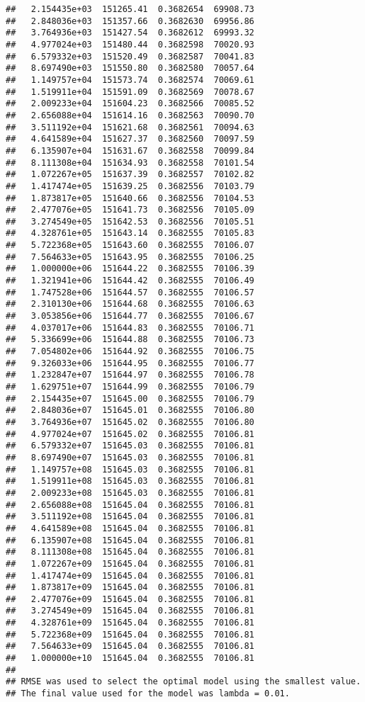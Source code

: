 \documentclass[]{article}
\begin{document}
\begin{verbatim}
##   2.154435e+03  151265.41  0.3682654  69908.73
##   2.848036e+03  151357.66  0.3682630  69956.86
##   3.764936e+03  151427.54  0.3682612  69993.32
##   4.977024e+03  151480.44  0.3682598  70020.93
##   6.579332e+03  151520.49  0.3682587  70041.83
##   8.697490e+03  151550.80  0.3682580  70057.64
##   1.149757e+04  151573.74  0.3682574  70069.61
##   1.519911e+04  151591.09  0.3682569  70078.67
##   2.009233e+04  151604.23  0.3682566  70085.52
##   2.656088e+04  151614.16  0.3682563  70090.70
##   3.511192e+04  151621.68  0.3682561  70094.63
##   4.641589e+04  151627.37  0.3682560  70097.59
##   6.135907e+04  151631.67  0.3682558  70099.84
##   8.111308e+04  151634.93  0.3682558  70101.54
##   1.072267e+05  151637.39  0.3682557  70102.82
##   1.417474e+05  151639.25  0.3682556  70103.79
##   1.873817e+05  151640.66  0.3682556  70104.53
##   2.477076e+05  151641.73  0.3682556  70105.09
##   3.274549e+05  151642.53  0.3682556  70105.51
##   4.328761e+05  151643.14  0.3682555  70105.83
##   5.722368e+05  151643.60  0.3682555  70106.07
##   7.564633e+05  151643.95  0.3682555  70106.25
##   1.000000e+06  151644.22  0.3682555  70106.39
##   1.321941e+06  151644.42  0.3682555  70106.49
##   1.747528e+06  151644.57  0.3682555  70106.57
##   2.310130e+06  151644.68  0.3682555  70106.63
##   3.053856e+06  151644.77  0.3682555  70106.67
##   4.037017e+06  151644.83  0.3682555  70106.71
##   5.336699e+06  151644.88  0.3682555  70106.73
##   7.054802e+06  151644.92  0.3682555  70106.75
##   9.326033e+06  151644.95  0.3682555  70106.77
##   1.232847e+07  151644.97  0.3682555  70106.78
##   1.629751e+07  151644.99  0.3682555  70106.79
##   2.154435e+07  151645.00  0.3682555  70106.79
##   2.848036e+07  151645.01  0.3682555  70106.80
##   3.764936e+07  151645.02  0.3682555  70106.80
##   4.977024e+07  151645.02  0.3682555  70106.81
##   6.579332e+07  151645.03  0.3682555  70106.81
##   8.697490e+07  151645.03  0.3682555  70106.81
##   1.149757e+08  151645.03  0.3682555  70106.81
##   1.519911e+08  151645.03  0.3682555  70106.81
##   2.009233e+08  151645.03  0.3682555  70106.81
##   2.656088e+08  151645.04  0.3682555  70106.81
##   3.511192e+08  151645.04  0.3682555  70106.81
##   4.641589e+08  151645.04  0.3682555  70106.81
##   6.135907e+08  151645.04  0.3682555  70106.81
##   8.111308e+08  151645.04  0.3682555  70106.81
##   1.072267e+09  151645.04  0.3682555  70106.81
##   1.417474e+09  151645.04  0.3682555  70106.81
##   1.873817e+09  151645.04  0.3682555  70106.81
##   2.477076e+09  151645.04  0.3682555  70106.81
##   3.274549e+09  151645.04  0.3682555  70106.81
##   4.328761e+09  151645.04  0.3682555  70106.81
##   5.722368e+09  151645.04  0.3682555  70106.81
##   7.564633e+09  151645.04  0.3682555  70106.81
##   1.000000e+10  151645.04  0.3682555  70106.81
## 
## RMSE was used to select the optimal model using the smallest value.
## The final value used for the model was lambda = 0.01.
\end{verbatim}
\end{document}
